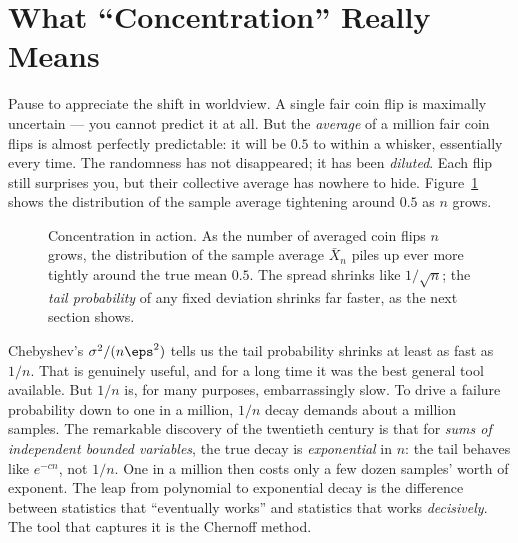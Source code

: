 \section{What ``Concentration'' Really Means}
\label{ch19:concentration}

Pause to appreciate the shift in worldview. A single fair coin flip is maximally
uncertain --- you cannot predict it at all. But the \emph{average} of a million
fair coin flips is almost perfectly predictable: it will be $0.5$ to within a
whisker, essentially every time. The randomness has not disappeared; it has
been \emph{diluted}. Each flip still surprises you, but their collective
average has nowhere to hide. Figure~\ref{ch19:fig-concentration} shows the
distribution of the sample average tightening around $0.5$ as $n$ grows.

\begin{figure}[H]
\centering
{}
\caption{Concentration in action. As the number of averaged coin flips $n$
grows, the distribution of the sample average $\bar X_n$ piles up ever more
tightly around the true mean $0.5$. The spread shrinks like $1/\sqrt n$; the
\emph{tail probability} of any fixed deviation shrinks far faster, as the next
section shows.}
\label{ch19:fig-concentration}
\end{figure}

\begin{aestheticbox}
Chebyshev's $\sigma^2/(n\eps^2)$ tells us the tail probability shrinks at least
as fast as $1/n$. That is genuinely useful, and for a long time it was the best
general tool available. But $1/n$ is, for many purposes, embarrassingly slow.
To drive a failure probability down to one in a million, $1/n$ decay demands
about a million samples. The remarkable discovery of the twentieth century is
that for \emph{sums of independent bounded variables}, the true decay is
\emph{exponential} in $n$: the tail behaves like $e^{-cn}$, not $1/n$. One in a
million then costs only a few dozen samples' worth of exponent. The leap from
polynomial to exponential decay is the difference between statistics that
``eventually works'' and statistics that works \emph{decisively}. The tool
that captures it is the Chernoff method.
\end{aestheticbox}

